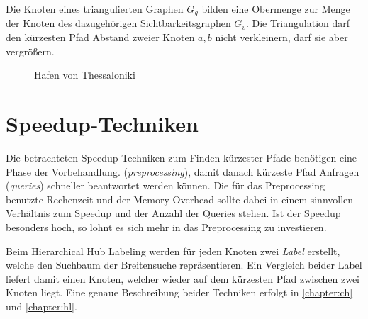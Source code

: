 
Die Knoten eines triangulierten Graphen $G_g$ bilden eine Obermenge zur Menge der Knoten des dazugehörigen Sichtbarkeitsgraphen $G_v$.
Die Triangulation darf den kürzesten Pfad Abstand zweier Knoten $a, b$ nicht verkleinern, darf sie aber vergrößern.


\begin{figure}[ht]%
    \centering
    \caption{Hafen von Thessaloniki}%
    \label{fig:thessaloniki}%
\end{figure}

\section{Speedup-Techniken}

Die betrachteten Speedup-Techniken zum Finden kürzester Pfade benötigen eine Phase der Vorbehandlung. (\emph{preprocessing}), damit danach kürzeste Pfad Anfragen (\emph{queries}) schneller beantwortet werden können.
Die für das Preprocessing benutzte Rechenzeit und der Memory-Overhead sollte dabei in einem sinnvollen Verhältnis zum Speedup und der Anzahl der Queries stehen.
Ist der Speedup besonders hoch, so lohnt es sich mehr in das Preprocessing zu investieren.


Beim Hierarchical Hub Labeling werden für jeden Knoten zwei \emph{Label} erstellt, welche den Suchbaum der Breitensuche repräsentieren.
Ein Vergleich beider Label liefert damit einen Knoten, welcher wieder auf dem kürzesten Pfad zwischen zwei Knoten liegt.
Eine genaue Beschreibung beider Techniken erfolgt in \autoref{chapter:ch} und \autoref{chapter:hl}.


